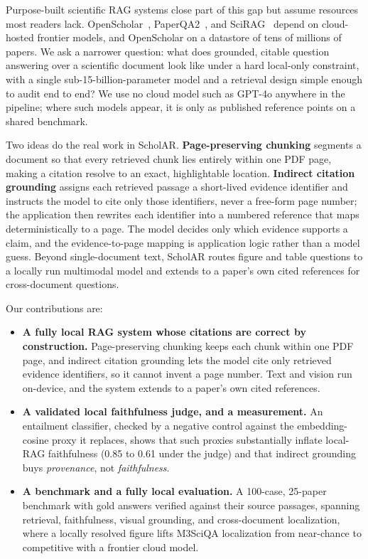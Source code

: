 \documentclass[11pt,letterpaper]{article}
\begin{document}
Purpose-built scientific RAG systems close part of this gap but assume resources most readers lack.
OpenScholar~\citep{asai2024openscholar}, PaperQA2~\citep{lala2024paperqa2}, and
SciRAG~\citep{ding2025scirag} depend on cloud-hosted frontier models, and OpenScholar on a datastore
of tens of millions of papers. We ask a narrower question: what does grounded, citable question
answering over a scientific document look like under a hard local-only constraint, with a single
sub-15-billion-parameter model and a retrieval design simple enough to audit end to end? We use no
cloud model such as GPT-4o anywhere in the pipeline; where such models appear, it is only as
published reference points on a shared benchmark.

Two ideas do the real work in ScholAR. \textbf{Page-preserving chunking} segments a document so that every
retrieved chunk lies entirely within one PDF page, making a citation resolve to an exact,
highlightable location. \textbf{Indirect citation grounding} assigns each retrieved passage a
short-lived evidence identifier and instructs the model to cite only those identifiers, never a
free-form page number;
the application then rewrites each identifier into a numbered reference that maps deterministically
to a page. The model decides only which evidence supports a claim, and the evidence-to-page mapping
is application logic rather than a model guess. Beyond single-document text,
ScholAR routes figure and table questions to a locally run multimodal model and extends to a
paper's own cited references for cross-document questions.

Our contributions are:
\begin{itemize}
  \item \textbf{A fully local RAG system whose citations are correct by construction.}
        Page-preserving chunking keeps each chunk within one PDF page, and indirect citation
        grounding lets the model cite only retrieved evidence identifiers, so it cannot invent a
        page number. Text and vision run on-device, and the system extends to a paper's own cited
        references.
  \item \textbf{A validated local faithfulness judge, and a measurement.} An entailment
        classifier, checked by a negative control against the embedding-cosine proxy it replaces,
        shows that such proxies substantially inflate local-RAG faithfulness (0.85 to 0.61 under the
        judge) and that indirect grounding buys \emph{provenance}, not \emph{faithfulness}.
  \item \textbf{A benchmark and a fully local evaluation.} A 100-case, 25-paper benchmark with
        gold answers verified against their source passages, spanning retrieval, faithfulness,
        visual grounding, and cross-document localization, where a locally resolved figure lifts
        M3SciQA localization from near-chance to competitive with a frontier cloud model.
\end{itemize}
\end{document}
